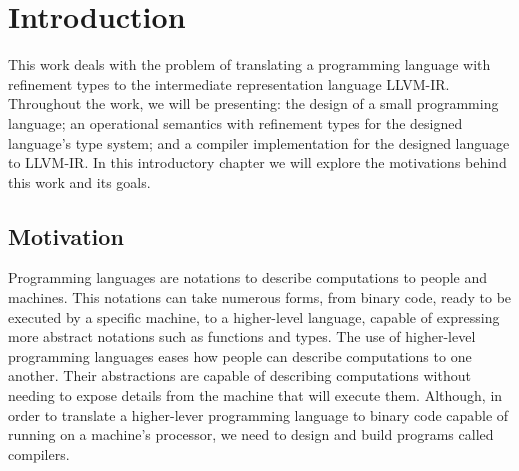 \documentclass[
  english,
  lmodern,
  oneside
]{ufsc-thesis-rn46-2019/ufsc-thesis-rn46-2019}
\begin{document}
\begin{listadesimbolos}
\end{listadesimbolos}

\tableofcontents*

\textual{}

\chapter{Introduction}\label{cap:introduction}

This work deals with the problem of translating a programming language with refinement types to the intermediate representation language LLVM-IR.\@
Throughout the work, we will be presenting: the design of a small programming language; an operational semantics with refinement types for the designed language's type system; and a compiler implementation for the designed language to LLVM-IR.\@
In this introductory chapter we will explore the motivations behind this work and its goals.

\section{Motivation}\label{cap:introduction:sec:motivation}

Programming languages are notations to describe computations to people and machines.
This notations can take numerous forms, from binary code, ready to be executed by a specific machine, to a higher-level language, capable of expressing more abstract notations such as functions and types.
The use of higher-level programming languages eases how people can describe computations to one another.
Their abstractions are capable of describing computations without needing to expose details from the machine that will execute them.
Although, in order to translate a higher-lever programming language to binary code capable of running on a machine's processor, we need to design and build programs called compilers.
\end{document}
